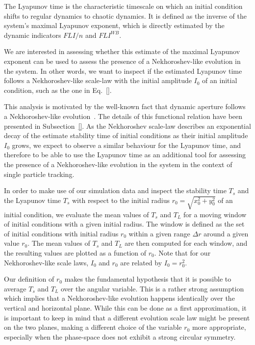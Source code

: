 The Lyapunov time is the characteristic timescale on which an initial condition shifts to regular dynamics to chaotic dynamics. It is defined as the inverse of the system's maximal Lyapunov exponent, which is directly estimated by the dynamic indicators $FLI/n$ and $FLI^{{WB}}$.

We are interested in assessing whether this estimate of the maximal Lyapunov exponent can be used to assess the presence of a Nekhoroshev-like evolution in the system. In other words, we want to inspect if the estimated Lyapunov time follows a Nekhoroshev-like scale-law with the initial amplitude $I_0$ of an initial condition, such as the one in Eq.~\eqref{}.

This analysis is motivated by the well-known fact that dynamic aperture follows a Nekhoroshev-like evolution~\cite{}. The details of this functional relation have been presented in Subsection~\ref{}. As the Nekhoroshev scale-law describes an exponential decay of the estimate stability time of initial conditions as their initial amplitude $I_0$ grows, we expect to observe a similar behaviour for the Lyapunov time, and therefore to be able to use the Lyapunov time as an additional tool for assessing the presence of a Nekhoroshev-like evolution in the system in the context of single particle tracking.

In order to make use of our simulation data and inspect the stability time $T_s$ and the Lyapunov time $T_s$ with respect to the initial radius $r_0 = \sqrt{x_0^2 + y_0^2}$ of an initial condition, we evaluate the mean values of $T_s$ and $T_L$ for a moving window of initial conditions with a given initial radius. The window is defined as the set of initial conditions with initial radius $r_0$ within a given range $\Delta r$ around a given value $r_0$. The mean values of $T_s$ and $T_L$ are then computed for each window, and the resulting values are plotted as a function of $r_0$. Note that for our Nekhoroshev-like scale laws, $I_0$ and $r_0$ are related by $I_0 = r_0^2$.

Our definition of $r_0$ makes the fundamental hypothesis that it is possible to average $T_s$ and $T_L$ over the angular variable. This is a rather strong assumption which implies that a Nekhoroshev-like evolution happens identically over the vertical and horizontal plane. While this can be done as a first approximation, it is important to keep in mind that a different evolution scale law might be present on the two planes, making a different choice of the variable $r_0$ more appropriate, especially when the phase-space does not exhibit a strong circular symmetry.


